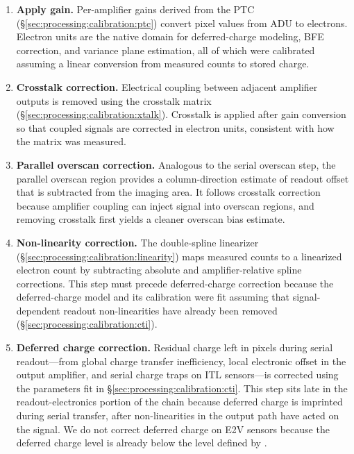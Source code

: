 \begin{enumerate}
    \item \textbf{Apply gain.}
    Per-amplifier gains derived from the PTC (\S\ref{sec:processing:calibration:ptc}) convert pixel values from ADU to electrons.
    Electron units are the native domain for deferred-charge modeling, BFE correction, and variance plane estimation, all of which were calibrated assuming a linear conversion from measured counts to stored charge.

    \item \textbf{Crosstalk correction.}
    Electrical coupling between adjacent amplifier outputs is removed using the crosstalk matrix (\S\ref{sec:processing:calibration:xtalk}).
    Crosstalk is applied after gain conversion so that coupled signals are corrected in electron units, consistent with how the matrix was measured.

    \item \textbf{Parallel overscan correction.}
    Analogous to the serial overscan step, the parallel overscan region provides a column-direction estimate of readout offset that is subtracted from the imaging area.
    It follows crosstalk correction because amplifier coupling can inject signal into overscan regions, and removing crosstalk first yields a cleaner overscan bias estimate.

    \item \textbf{Non-linearity correction.}
    The double-spline linearizer (\S\ref{sec:processing:calibration:linearity}) maps measured counts to a linearized electron count by subtracting absolute and amplifier-relative spline corrections.
    This step must precede deferred-charge correction because the deferred-charge model and its calibration were fit assuming that signal-dependent readout non-linearities have already been removed (\S\ref{sec:processing:calibration:cti}).

    \item \textbf{Deferred charge correction.}
    Residual charge left in pixels during serial readout---from global charge transfer inefficiency, local electronic offset in the output amplifier, and serial charge traps on ITL sensors---is corrected using the parameters fit in \S\ref{sec:processing:calibration:cti}.
    This step sits late in the readout-electronics portion of the chain because deferred charge is imprinted during serial transfer, after non-linearities in the output path have acted on the signal.
    We do not correct deferred charge on E2V sensors because the deferred charge level is already below the level defined by \citet{LPM-17}.


\end{enumerate}
